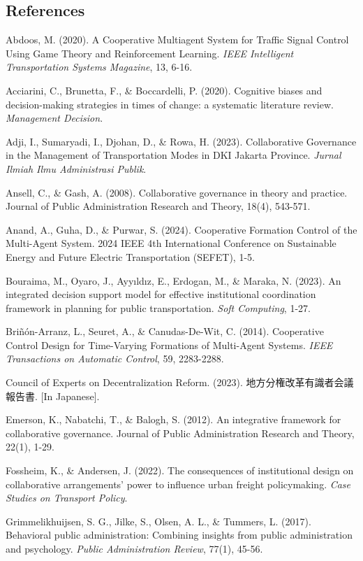 \subsection{References}\label{references}

Abdoos, M. (2020). A Cooperative Multiagent System for Traffic Signal Control Using Game Theory and Reinforcement Learning. \emph{IEEE Intelligent Transportation Systems Magazine}, 13, 6-16.

Acciarini, C., Brunetta, F., \& Boccardelli, P. (2020). Cognitive biases and decision-making strategies in times of change: a systematic literature review. \emph{Management Decision}.

Adji, I., Sumaryadi, I., Djohan, D., \& Rowa, H. (2023). Collaborative Governance in the Management of Transportation Modes in DKI Jakarta Province. \emph{Jurnal Ilmiah Ilmu Administrasi Publik}.

Ansell, C., \& Gash, A. (2008). Collaborative governance in theory and practice. Journal of Public Administration Research and Theory, 18(4), 543-571.

Anand, A., Guha, D., \& Purwar, S. (2024). Cooperative Formation Control of the Multi-Agent System. 2024 IEEE 4th International Conference on Sustainable Energy and Future Electric Transportation (SEFET), 1-5.

Bouraima, M., Oyaro, J., Ayyıldız, E., Erdogan, M., \& Maraka, N. (2023). An integrated decision support model for effective institutional coordination framework in planning for public transportation. \emph{Soft Computing}, 1-27.

Briñón-Arranz, L., Seuret, A., \& Canudas-De-Wit, C. (2014). Cooperative Control Design for Time-Varying Formations of Multi-Agent Systems. \emph{IEEE Transactions on Automatic Control}, 59, 2283-2288.

Council of Experts on Decentralization Reform. (2023). 地方分権改革有識者会議 報告書. {[}In Japanese{]}.

Emerson, K., Nabatchi, T., \& Balogh, S. (2012). An integrative framework for collaborative governance. Journal of Public Administration Research and Theory, 22(1), 1-29.

Fossheim, K., \& Andersen, J. (2022). The consequences of institutional design on collaborative arrangements' power to influence urban freight policymaking. \emph{Case Studies on Transport Policy}.

Grimmelikhuijsen, S. G., Jilke, S., Olsen, A. L., \& Tummers, L. (2017). Behavioral public administration: Combining insights from public administration and psychology. \emph{Public Administration Review}, 77(1), 45-56.

